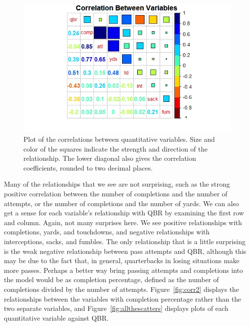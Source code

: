 \documentclass[12pt]{article}\usepackage[]{graphicx}\usepackage[]{color}
\begin{document}
\begin{figure}[h]
\centering
\includegraphics[width=1.2\textwidth]{correlation.jpeg}
\captionsetup{font=footnotesize,labelfont=footnotesize}
\caption{\label{fig:corr} Plot of the correlations between quantitative variables. Size and color of the squares indicate the strength and direction of the relationship. The lower diagonal also gives the correlation coefficients, rounded to two decimal places.}
\end{figure}

Many of the relationships that we see are not surprising, such as the strong positive correlation between the number of completions and the number of attempts, or the number of completions and the number of yards. We can also get a sense for each variable's relationship with QBR by examining the first row and column. Again, not many surprises here. We see positive relationships with completions, yards, and touchdowns, and negative relationships with interceptions, sacks, and fumbles. The only relationship that is a little surprising is the weak negative relationship between pass attempts and QBR, although this may be due to the fact that, in general, quarterbacks in losing situations make more passes. Perhaps a better way bring passing attempts and completions into the model would be as completion percentage, defined as the number of completions divided by the number of attempts. Figure~\ref{fig:corr2} displays the relationships between the variables with completion percentage rather than the two separate variables, and Figure~\ref{fig:allthescatters} displays plots of each quantitative variable against QBR.
\end{document}
